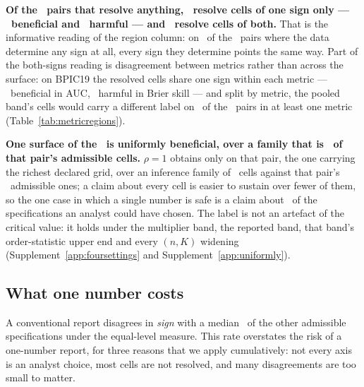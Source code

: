 \textbf{Of the \nPairsResolvingAny\ pairs that resolve anything,
\nPairsResolveOneSign\ resolve cells of one sign only ---
\nPairsResolveBeneficialOnly\ beneficial and
\nPairsResolveHarmfulOnly\ harmful --- and
\nPairsResolveBothSigns\ resolve cells of both.} That is the informative
reading of the region column: on \nPairsResolveOneSign\ of the
\nPairsResolvingAny\ pairs where the data determine any sign at all, every
sign they determine points the same way. Part of the both-signs reading is
disagreement between metrics rather than across the surface: on BPIC19 the
resolved cells share one sign within each metric --- \nBpicNineteenBenAuc\
beneficial in AUC, \nBpicNineteenHarmBrier\ harmful in Brier skill --- and
split by metric, the pooled band's cells would carry a different label on
\nPairsLabelDiffersAny\ of the \nPairs\ pairs in at least one metric
(Table~\ref{tab:metricregions}).

\textbf{One surface of the \nPairs\ is uniformly beneficial, over a family
that is \shareUniformFamilyPct\ of that pair's admissible cells.} $\rho = 1$
obtains only on that pair, the one carrying the richest
declared grid, over an inference family of \nCellsPerPairMedian\ cells
against that pair's \nCellsUniformPair\ admissible ones; a claim about every
cell is easier to sustain over fewer of them, so the one case in which a
single number is safe is a claim about \shareUniformFamilyPct\ of the
specifications an analyst could have chosen. The label is not an artefact of
the critical value: it holds under the multiplier band, the reported band,
that band's order-statistic upper end and every $(n, K)$ widening
(Supplement~\ref{app:foursettings} and Supplement~\ref{app:uniformly}).

\subsection{What one number costs}
\label{sec:results-regret}

A conventional report disagrees in \emph{sign} with a median
\misreportEqualPct\ of the other admissible specifications under the
equal-level measure. This rate overstates the risk of a one-number report,
for three reasons that we apply cumulatively: not every axis is an analyst
choice, most cells are not resolved, and many disagreements are too small to
matter.

